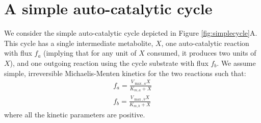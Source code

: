 \documentclass[a4page,notitlepage]{article}
\begin{document}
\section{A simple auto-catalytic cycle}
    We consider the simple auto-catalytic cycle depicted in Figure \ref{fig:simplecycle}A.
    This cycle has a single intermediate metabolite, $X$, one auto-catalytic reaction with flux $f_a$ (implying that for any unit of $X$ consumed, it produces two units of $X$), and one outgoing reaction using the cycle substrate with flux $f_b$.
    We assume simple, irreversible Michaelis-Menten kinetics for the two reactions such that:
    \begin{eqnarray*}
      f_a = \frac{V_{\max,a}X}{K_{m,a}+X} \\
      f_b = \frac{V_{\max,b}X}{K_{m,b}+X}
    \end{eqnarray*}
    where all the kinetic parameters are positive.
\end{document}
